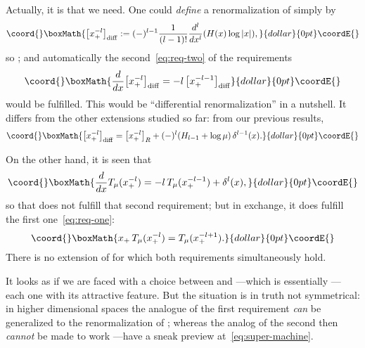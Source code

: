 \documentclass[a4paper,12pt]{article}
\providecommand{\diff}{{\mathrm{diff}}} %
\providecommand{\dl}{\delta}           %
\DeclareMathOperator{\Pf}{Pf}      %
\providecommand{\7}{\dagger}           %
\theoremstyle{plain}
\theoremstyle{definition}
\begin{document}
Actually, it is \coordHE{} that we need. One could \textit{define} a
renormalization \myHighlight{$\bigl[x_+^{-l}\bigr]_\diff$}\coordHE{} of \coordHE{} simply by
$$\coord{}\boxMath{
\bigl[x_+^{-l}\bigr]_\diff :=
(-)^{l-1} \frac{1}{(l-1)!} \frac{d^l}{dx^l} (H(x) \log|x|),
}{dollar}{0pt}\coordE{}$$
so \myHighlight{$\bigl[x_+^{-1}\bigr]_\diff = \Pf \frac{H(x)}{x}$}\coordHE{}; and
automatically the second~\eqref{eq:req-two} of the requirements
$$\coord{}\boxMath{
\frac{d}{dx} \bigl[x_+^{-l}\bigr]_\diff =
-l\,\bigl[x_+^{-l-1}\bigr]_\diff
}{dollar}{0pt}\coordE{}$$
would be fulfilled. This would be ``differential renormalization'' in
a nutshell. It differs from the other extensions studied so far: from
our previous results,
$$\coord{}\boxMath{
\bigl[x_+^{-l}\bigr]_\diff = \bigl[x_+^{-l}\bigr]_R
+ (-)^l (H_{l-1} + \log\mu) \,\dl^{l-1}(x).
}{dollar}{0pt}\coordE{}$$

On the other hand, it is seen that
$$\coord{}\boxMath{
\frac{d}{dx} T_\mu(x_+^{-l}) = -l\,T_\mu(x_+^{-l-1}) + \dl^l(x),
}{dollar}{0pt}\coordE{}$$
so that \coordHE{} does not fulfill that second requirement; but in
exchange, it does fulfill the first one~\eqref{eq:req-one}:
$$\coord{}\boxMath{
x_+\,T_\mu(x_+^{-l}) = T_\mu(x_+^{-l+1}).
}{dollar}{0pt}\coordE{}$$
There is no extension of \coordHE{} for which both requirements
simultaneously hold.

It looks as if we are faced with a choice between \myHighlight{$[\cdot]_\diff$}\coordHE{} and
\coordHE{} ---which is essentially \myHighlight{$\Pf(\cdot)$}\coordHE{}--- each one with
its attractive feature. But the situation is in truth not symmetrical:
in higher dimensional spaces the analogue of the first requirement
\textit{can} be generalized to the renormalization of \coordHE{};
whereas the analog of the second then \textit{cannot} be made to work
---have a sneak preview at~\eqref{eq:super-machine}.

\smallskip
\end{document}
